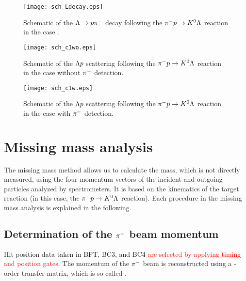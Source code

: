 \begin{figure}[!h]
  \begin{center}
    \texttt{[image: sch\_Ldecay.eps]}
    \caption{Schematic of the $\Lambda\to p\pi^{-}$ decay following the $\pi^- p \to K^0 \Lambda$ reaction in the case .}
    \label{fig-sch_Ldecay}
  \end{center}
\end{figure}

\begin{figure}[!h]
  \begin{center}
    \texttt{[image: sch\_c1wo.eps]}
    \caption{Schematic of the $\Lambda p$ scattering following the $\pi^- p \to K^0 \Lambda$ reaction in the case  without $\pi^{-}$ detection.}
    \label{fig-sch_c2wo}
  \end{center}
\end{figure}

\begin{figure}[!h]
  \begin{center}
    \texttt{[image: sch\_c1w.eps]}
    \caption{Schematic of the $\Lambda p$ scattering following the $\pi^- p \to K^0 \Lambda$ reaction in the case  with $\pi^{-}$ detection.}
    \label{fig-sch_c2w}
  \end{center}
\end{figure}


\clearpage
\section{Missing mass analysis}
The missing mass method allows us to calculate the mass, which is not directly measured, using the four-momentum vectors of the incident and outgoing particles analyzed by spectrometers. It is based on the kinematics of the target reaction (in this case, the $\pi^- p \to K^0 \Lambda$ reaction). Each procedure in the missing mass analysis is explained in the following.

\subsection{Determination of the $\pi^{-}$ beam momentum}
Hit position data taken in BFT, BC3, and BC4 \textcolor{red}{ are selected by applying timing and position gates. } The momentum of the $\pi^{-}$ beam is reconstructed using a -order transfer matrix, which is so-called .
  

